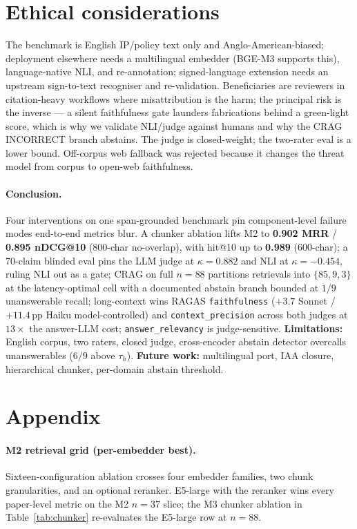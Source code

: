 \documentclass[11pt]{article}
\begin{document}
\section{Ethical considerations}
\label{sec:ethics}

The benchmark is English IP/policy text only and Anglo-American-biased; deployment elsewhere needs a multilingual embedder (BGE-M3 supports this), language-native NLI, and re-annotation; signed-language extension needs an upstream sign-to-text recogniser and re-validation. Beneficiaries are reviewers in citation-heavy workflows where misattribution is the harm; the principal risk is the inverse --- a silent faithfulness gate launders fabrications behind a green-light score, which is why we validate NLI/judge against humans and why the CRAG INCORRECT branch abstains. The judge is closed-weight; the two-rater eval is a lower bound. Off-corpus web fallback was rejected because it changes the threat model from corpus to open-web faithfulness.


\paragraph{Conclusion.}\label{sec:conclusion} Four interventions on one span-grounded benchmark pin component-level failure modes end-to-end metrics blur. A chunker ablation lifts M2 to \textbf{0.902 MRR} / \textbf{0.895 nDCG@10} (800-char no-overlap), with hit@10 up to \textbf{0.989} (600-char); a 70-claim blinded eval pins the LLM judge at $\kappa{=}0.882$ and NLI at $\kappa{=}-0.454$, ruling NLI out as a gate; CRAG on full $n{=}88$ partitions retrievals into $\{85, 9, 3\}$ at the latency-optimal cell with a documented abstain branch bounded at $1/9$ unanswerable recall; long-context wins RAGAS \texttt{faithfulness} ($+3.7$ Sonnet / $+11.4$\,pp Haiku model-controlled) and \texttt{context\_precision} across both judges at $13\times$ the answer-LLM cost; \texttt{answer\_relevancy} is judge-sensitive. \textbf{Limitations:} English corpus, two raters, closed judge, cross-encoder abstain detector overcalls unanswerables ($6/9$ above $\tau_h$). \textbf{Future work:} multilingual port, IAA closure, hierarchical chunker, per-domain abstain threshold.


\appendix

\section{Appendix}\label{sec:appendix}

\paragraph{M2 retrieval grid (per-embedder best).} Sixteen-configuration ablation crosses four embedder families, two chunk granularities, and an optional reranker. E5-large with the reranker wins every paper-level metric on the M2 $n{=}37$ slice; the M3 chunker ablation in Table~\ref{tab:chunker} re-evaluates the E5-large row at $n{=}88$.
\end{document}
